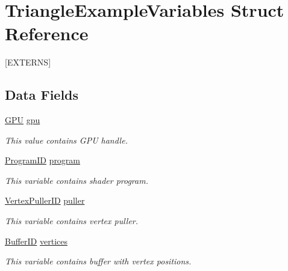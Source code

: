\hypertarget{structTriangleExampleVariables}{\section{Triangle\-Example\-Variables Struct Reference}
\label{structTriangleExampleVariables}
}


\mbox{[}E\-X\-T\-E\-R\-N\-S\mbox{]}  


\subsection*{Data Fields}
\begin{DoxyCompactItemize}
\item 
\hypertarget{structTriangleExampleVariables_a6c5c3f82065ae9aac07f9e6f11dd03b3}{\hyperlink{fwd_8h_a06964ec111fe28721d8618b6d0d993bf}{G\-P\-U} \hyperlink{structTriangleExampleVariables_a6c5c3f82065ae9aac07f9e6f11dd03b3}{gpu}}\label{structTriangleExampleVariables_a6c5c3f82065ae9aac07f9e6f11dd03b3}

\begin{DoxyCompactList}\small\item\em This value contains G\-P\-U handle. \end{DoxyCompactList}\item 
\hypertarget{structTriangleExampleVariables_aabf788228d2e91e2718facfbd911c8cc}{\hyperlink{fwd_8h_a15e62786033208aec9487a51e808f81d}{Program\-I\-D} \hyperlink{structTriangleExampleVariables_aabf788228d2e91e2718facfbd911c8cc}{program}}\label{structTriangleExampleVariables_aabf788228d2e91e2718facfbd911c8cc}

\begin{DoxyCompactList}\small\item\em This variable contains shader program. \end{DoxyCompactList}\item 
\hypertarget{structTriangleExampleVariables_a82e39dd0d18fc57422686229d801e39f}{\hyperlink{fwd_8h_a23828e2281a794e193ebaf0df3e1f17c}{Vertex\-Puller\-I\-D} \hyperlink{structTriangleExampleVariables_a82e39dd0d18fc57422686229d801e39f}{puller}}\label{structTriangleExampleVariables_a82e39dd0d18fc57422686229d801e39f}

\begin{DoxyCompactList}\small\item\em This variable contains vertex puller. \end{DoxyCompactList}\item 
\hypertarget{structTriangleExampleVariables_acb7968b625f2e01866994769209cf32e}{\hyperlink{fwd_8h_a60a12bf4868ebe47cc571ce96a03f99c}{Buffer\-I\-D} \hyperlink{structTriangleExampleVariables_acb7968b625f2e01866994769209cf32e}{vertices}}\label{structTriangleExampleVariables_acb7968b625f2e01866994769209cf32e}

\begin{DoxyCompactList}\small\item\em This variable contains buffer with vertex positions. \end{DoxyCompactList}\end{DoxyCompactItemize}


